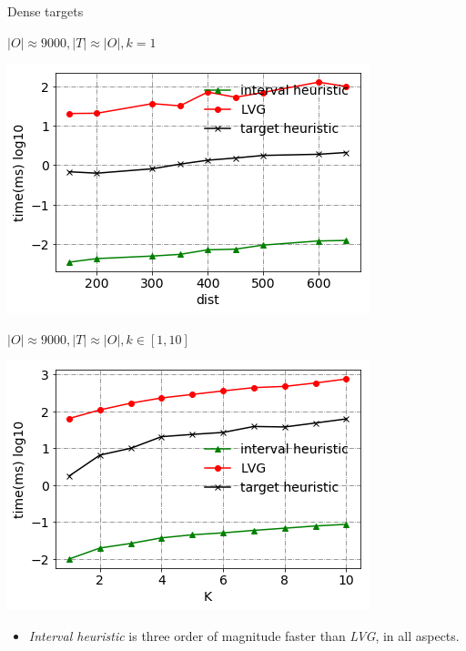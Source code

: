 \begin{frame}{Dense targets}
\begin{minipage}{.5\textwidth}
    \centering
    \small{$|O| \approx 9000, |T| \approx |O|, k=1$}
    \begin{adjustbox}{max totalsize={.9\textwidth}{.9\textheight}, right}
    \centering
    \includegraphics{pic/e1_dense_time.png}
    \end{adjustbox}
\end{minipage}%
\begin{minipage}{.5\textwidth}
    \centering
    \small{$|O| \approx 9000, |T| \approx |O|, k \in [1, 10]$}
    \begin{adjustbox}{max totalsize={.9\textwidth}{.9\textheight}, right}
    \centering
    \includegraphics{pic/e2_dense_time.png}
    \end{adjustbox}
\end{minipage}
\begin{itemize}
    \item \small{\textit{Interval heuristic} is three order of magnitude faster than \textit{LVG}, in all aspects.}
\end{itemize}
\end{frame}

